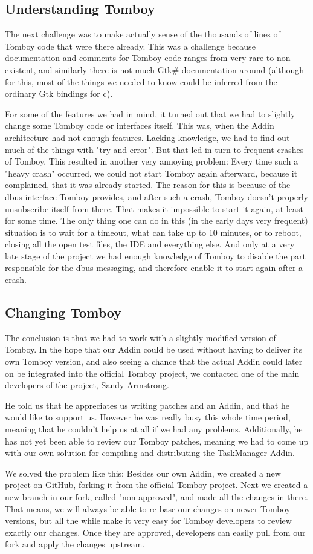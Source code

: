 \subsection{Understanding Tomboy}
\label{understanding_tomboy}
The next challenge was to make actually sense of the thousands of lines of Tomboy code that were there already. This was a challenge because documentation and comments for Tomboy code ranges from very rare to non-existent, and similarly there is not much Gtk\# documentation around (although for this, most of the things we needed to know could be inferred from the ordinary Gtk bindings for c).

For some of the features we had in mind, it turned out that we had to slightly change some Tomboy code or interfaces itself. This was, when the Addin architecture had not enough features. Lacking knowledge, we had to find out much of the things with "try and error". But that led in turn to frequent crashes of Tomboy. This resulted in another very annoying problem: Every time such a "heavy crash" occurred, we could not start Tomboy again afterward, because it complained, that it was already started. The reason for this is because of the dbus interface Tomboy provides, and after such a crash, Tomboy doesn't properly unsubscribe itself from there. That makes it impossible to start it again, at least for some time. The only thing one can do in this (in the early days very frequent) situation is to wait for a timeout, what can take up to 10 minutes, or to reboot, closing all the open test files, the IDE and everything else. And only at a very late stage of the project we had enough knowledge of Tomboy to disable the part responsible for the dbus messaging, and therefore enable it to start again after a crash.


\subsection{Changing Tomboy}
\label{changing_tomboy}
The conclusion is that we had to work with a slightly modified version of Tomboy. In the hope that our Addin could be used without having to deliver its own Tomboy version, and also seeing a chance that the actual Addin could later on be integrated into the official Tomboy project, we contacted one of the main developers of the project, Sandy Armstrong.

He told us that he appreciates us writing patches and an Addin, and that he would like to support us. However he was really busy this whole time period, meaning that he couldn't help us at all if we had any problems. Additionally, he has not yet been able to review our Tomboy patches, meaning we had to come up with our own solution for compiling and distributing the TaskManager Addin.

We solved the problem like this: Besides our own Addin, we created a new project on GitHub, forking it from the official Tomboy project. Next we created a new branch in our fork, called "non-approved", and made all the changes in there. That means, we will always be able to re-base our changes on newer Tomboy versions, but all the while make it very easy for Tomboy developers to review exactly our changes. Once they are approved, developers can easily pull from our fork and apply the changes upstream.